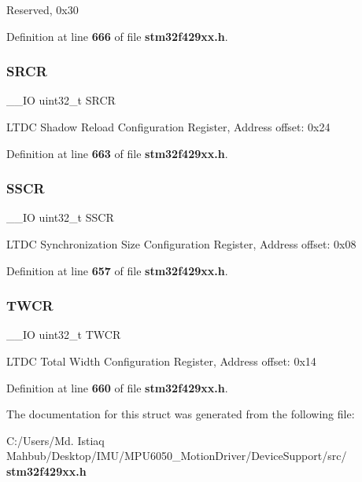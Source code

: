 Reserved, 0x30 

Definition at line \textbf{ 666} of file \textbf{ stm32f429xx.\+h}.

\mbox{\label{structLTDC__TypeDef_a92af0fef30467bfce8d1408f81cfda6d}} 
\subsubsection{S\+R\+CR}
{\footnotesize\ttfamily \+\_\+\+\_\+\+IO uint32\+\_\+t S\+R\+CR}

L\+T\+DC Shadow Reload Configuration Register, Address offset\+: 0x24 

Definition at line \textbf{ 663} of file \textbf{ stm32f429xx.\+h}.

\mbox{\label{structLTDC__TypeDef_a3aa8cb3b286c630b9fa126616a1f6498}} 
\subsubsection{S\+S\+CR}
{\footnotesize\ttfamily \+\_\+\+\_\+\+IO uint32\+\_\+t S\+S\+CR}

L\+T\+DC Synchronization Size Configuration Register, Address offset\+: 0x08 

Definition at line \textbf{ 657} of file \textbf{ stm32f429xx.\+h}.

\mbox{\label{structLTDC__TypeDef_ace97ea64f6db802fc5488601bb8558ab}} 
\subsubsection{T\+W\+CR}
{\footnotesize\ttfamily \+\_\+\+\_\+\+IO uint32\+\_\+t T\+W\+CR}

L\+T\+DC Total Width Configuration Register, Address offset\+: 0x14 

Definition at line \textbf{ 660} of file \textbf{ stm32f429xx.\+h}.



The documentation for this struct was generated from the following file\+:\begin{DoxyCompactItemize}
\item 
C\+:/\+Users/\+Md. Istiaq Mahbub/\+Desktop/\+I\+M\+U/\+M\+P\+U6050\+\_\+\+Motion\+Driver/\+Device\+Support/src/\textbf{ stm32f429xx.\+h}\end{DoxyCompactItemize}
